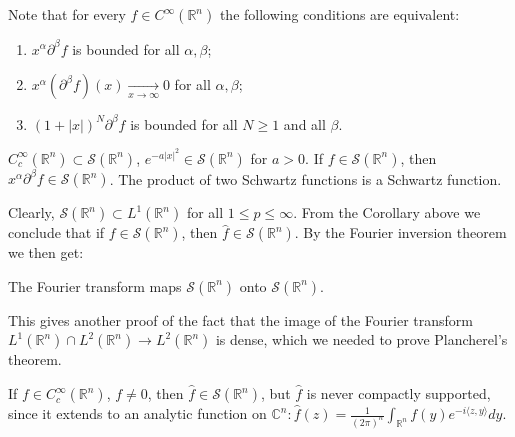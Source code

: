 Note that for every \(f\in C^{\infty}(\mathbb{R}^n)\) the following conditions are equivalent:
\begin{enumerate}
    \item \(x^{\alpha}\partial^{\beta}f\) is bounded for all \(\alpha,\beta\);
    \item \(x^{\alpha}(\partial^{\beta}f)(x)\xrightarrow[x\rightarrow\infty]{ }0\) for all \(\alpha,\beta\);
    \item \((1+|x|)^N\partial^{\beta}f\) is bounded for all \(N\geq 1\) and all \(\beta\).
\end{enumerate}
\begin{example}
    \(C^{\infty}_{c}(\mathbb{R}^n)\subset \mathcal{S}(\mathbb{R}^n)\), \(e^{-a|x|^2}\in\mathcal{S}(\mathbb{R}^n)\) for \(a>0\). If \(f\in \mathcal{S}(\mathbb{R}^n)\), then \(x^{\alpha}\partial^{\beta}f\in\mathcal{S}(\mathbb{R}^n)\). The product of two Schwartz functions is a Schwartz function. 
\end{example}

Clearly, \(\mathcal{S}(\mathbb{R}^n)\subset L^{1}(\mathbb{R}^n)\) for all \(1\leq p\leq\infty\). From the Corollary above we conclude that if \(f\in\mathcal{S}(\mathbb{R}^n)\), then \(\hat{f}\in\mathcal{S}(\mathbb{R}^n)\). By the Fourier inversion theorem we then get:
\begin{theorem}
    The Fourier transform maps \(\mathcal{S}(\mathbb{R}^n)\) onto \(\mathcal{S}(\mathbb{R}^n)\).
\end{theorem}
\begin{remark}
    This gives another proof of the fact that the image of the Fourier transform \(L^1(\mathbb{R}^n)\cap L^2(\mathbb{R}^n)\rightarrow L^2(\mathbb{R}^n)\) is dense, which we needed to prove Plancherel's theorem.
\end{remark}
\begin{remark}
    If \(f\in C^{\infty}_{c}(\mathbb{R}^n)\), \(f\neq 0\), then \(\hat{f}\in\mathcal{S}(\mathbb{R}^n)\), but \(\hat{f}\) is never compactly supported, since it extends to an analytic function on \(\mathbb{C}^n: \hat{f}(z)=\frac{1}{(2\pi)^n}\int_{\mathbb{R}^n}f(y)e^{-i\langle z,y\rangle}dy\).
\end{remark}